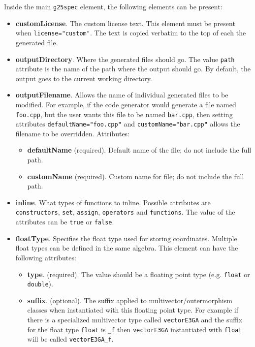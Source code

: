 \documentclass[10pt, a4paper]{article}
\begin{document}
  
Inside the main {\tt g25spec} element, the following elements can be present:
\begin{itemize}
\item {\bf customLicense}. The custom license text. This element must be present when {\tt license="custom"}. 
         The text is copied verbatim to the top of each the generated file.
         
\item {\bf outputDirectory}. Where the generated files should go. The value {\tt path} attribute is the name of the path
	where the output should go. By default, the output goes to the current working directory.
       
\item {\bf outputFilename}. Allows the name of individual generated files to be modified. For example, if the code generator 
       would generate a file named {\tt foo.cpp}, but the user wants this file to be named {\tt bar.cpp}, then setting 
       attributes {\tt defaultName="foo.cpp"} and {\tt customName="bar.cpp"}
       allows the filename to be overridden. Attributes:
       \begin{itemize}
       \item {\bf defaultName} (required). Default name of the file; do not include the full path.
       \item {\bf customName} (required). Custom name for file; do not include the full path.
       \end{itemize}
         
\item {\bf inline}. What types of functions to inline. Possible attributes are {\tt constructors}, 
      {\tt set}, {\tt assign}, {\tt operators} and {\tt functions}.
      The value of the attributes can be {\tt true} or {\tt false}.
      
\item {\bf floatType}. Specifies the float type used for storing coordinates.
	Multiple float types can be defined in the same algebra. This element can have the following attributes:
       \begin{itemize}
       \item {\bf type}. (required). The value should be a floating point type (e.g. {\tt float} or {\tt double}).
       
       \item {\bf suffix}. (optional). The suffix applied to multivector/outermorphism classes when instantiated with this
            floating point type. For example if there is a specialized multivector type called {\tt vectorE3GA} and the suffix
            for the float type {\tt float} is {\tt \_f} then {\tt vectorE3GA} instantiated with {\tt float}
            will be called {\tt vectorE3GA\_f}.
            

\end{itemize}
\end{itemize}
\end{document}

